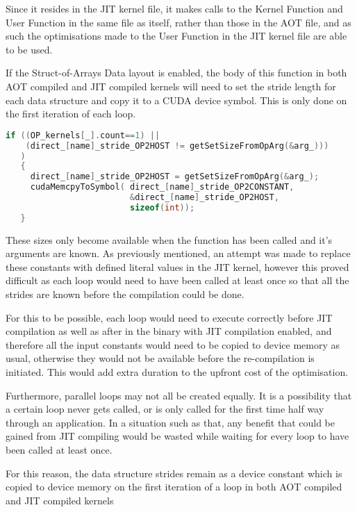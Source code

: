 \noindent Since it resides in the JIT kernel file, it makes calls to the Kernel Function and User Function in the same file as itself, rather than those in the AOT file, and as such the optimisations made to the User Function in the JIT kernel file are able to be used.

If the Struct-of-Arrays Data layout is enabled, the body of this function in both AOT compiled and JIT compiled kernels will need to set the stride length for each data structure and copy it to a CUDA device symbol. This is only done on the first iteration of each loop.
\begin{lstlisting}[linewidth = \textwidth, framesep=0pt,escapechar=:, language=C,backgroundcolor=\color{red!20}]
if ((OP_kernels[_].count==1) ||
    (direct_[name]_stride_OP2HOST != getSetSizeFromOpArg(&arg_)))
   )
   {
     direct_[name]_stride_OP2HOST = getSetSizeFromOpArg(&arg_);
     cudaMemcpyToSymbol( direct_[name]_stride_OP2CONSTANT,
                         &direct_[name]_stride_OP2HOST,
                         sizeof(int));
   }
\end{lstlisting}


\noindent These sizes only become available when the function has been called and it's arguments are known. As previously mentioned, an attempt was made to replace these constants with defined literal values in the JIT kernel, however this proved difficult as each loop would need to have been called at least once so that all the strides are known before the compilation could be done.
\par
For this to be possible, each loop would need to execute correctly before JIT compilation as well as after in the binary with JIT compilation enabled, and therefore all the input constants would need to be copied to device memory as usual, otherwise they would not be available before the re-compilation is initiated. This would add extra duration to the upfront cost of the optimisation.\par
Furthermore, parallel loops may not all be created equally. It is a possibility that a certain loop never gets called, or is only called for the first time half way through an application. In a situation such as that, any benefit that could be gained from JIT compiling would be wasted while waiting for every loop to have been called at least once.
\par
For this reason, the data structure strides remain as a device constant which is copied to device memory on the first iteration of a loop in both AOT compiled and JIT compiled kernels

